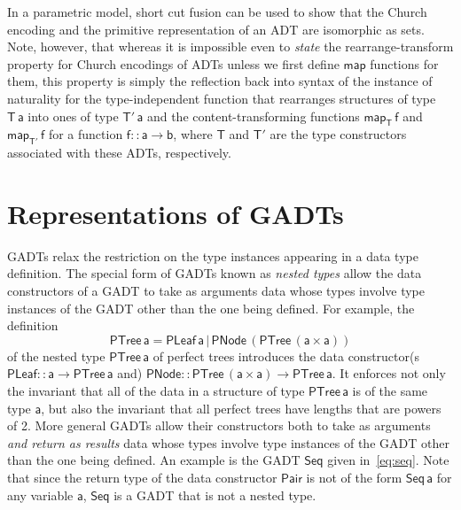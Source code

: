 \documentclass[acmsmall,screen,review,anonymous]{acmart}
\theoremstyle{definition}
\begin{document}
In a parametric model, short cut fusion can be used to show that the
Church encoding and the primitive representation of an ADT are
isomorphic as sets. Note, however, that whereas it is impossible even
to {\em state} the rearrange-transform property for Church encodings
of ADTs {\color{blue} unless we first define $\mathsf{map}$ functions
  for them}, this property is simply the reflection back into syntax
of the instance of naturality for the type-independent function that
rearranges structures of type $\mathsf{T\,a}$ into ones of type
$\mathsf{T'\,a}$ and the content-transforming functions
$\mathsf{map_T\,f}$ and $\mathsf{map_{T'}\,f}$ for a function
$\mathsf{f :: a \to b}$, where $\mathsf{T}$ and $\mathsf{T'}$ are the
type constructors associated with these ADTs, respectively.

\section{Representations of GADTs}\label{sec:gadts}

GADTs relax the restriction on the type instances appearing in a data
type definition. The special form of GADTs known as {\em nested types}
allow the data constructors of a GADT to take as arguments data whose
types involve type instances of the GADT other than the one being
defined. For example, the definition
\[\mathsf{PTree \, a = PLeaf \,a \,|\, PNode \,(PTree\,(a \times
  a))}\] of the nested type $\mathsf{PTree\,a}$ of perfect trees
introduces the data constructor(s $\mathsf{PLeaf :: a \to PTree\,a}$
and) $\mathsf{PNode :: PTree \,(a\times a) \to PTree\,a}$. It enforces
not only the invariant that all of the data in a structure of type
$\mathsf{PTree\,a}$ is of the same type $\mathsf{a}$, but also the
invariant that all perfect trees have lengths that are powers of
2. More general GADTs allow their constructors both to take as
arguments {\em and return as results} data whose types involve type
instances of the GADT other than the one being defined. An example is
the GADT $\mathsf{Seq}$ given in~\eqref{eq:seq}. Note that since the
return type of the data constructor $\mathsf{Pair}$ is not of the form
$\mathsf{Seq\,a}$ for any variable $\mathsf{a}$, $\mathsf{Seq}$ is a
GADT that is not a nested type.
\end{document}

